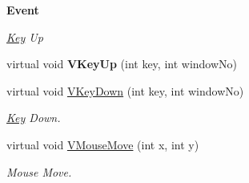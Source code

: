 \begin{Indent}{\bf Event}\par
{\em \label{_amgrpa4ecfc70574394990cf17bd83df499f7}
 \hyperlink{structPlatform_1_1Input_1_1Key}{Key} Up }\begin{DoxyCompactItemize}
\item 
\hypertarget{classPlatform_1_1Input_1_1Input_aaa4710a78618fc48f52d121ae93301fa}{
virtual void {\bfseries VKeyUp} (int key, int windowNo)}
\label{classPlatform_1_1Input_1_1Input_aaa4710a78618fc48f52d121ae93301fa}

\item 
\hypertarget{classPlatform_1_1Input_1_1Input_a37ca3683d6f84d521b4ded7f438ba268}{
virtual void \hyperlink{classPlatform_1_1Input_1_1Input_a37ca3683d6f84d521b4ded7f438ba268}{VKeyDown} (int key, int windowNo)}
\label{classPlatform_1_1Input_1_1Input_a37ca3683d6f84d521b4ded7f438ba268}

\begin{DoxyCompactList}\small\item\em \hyperlink{structPlatform_1_1Input_1_1Key}{Key} Down. \item\end{DoxyCompactList}\item 
\hypertarget{classPlatform_1_1Input_1_1Input_af345cc254cae171098d6b06136dd796c}{
virtual void \hyperlink{classPlatform_1_1Input_1_1Input_af345cc254cae171098d6b06136dd796c}{VMouseMove} (int x, int y)}
\label{classPlatform_1_1Input_1_1Input_af345cc254cae171098d6b06136dd796c}

\begin{DoxyCompactList}\small\item\em Mouse Move. \item\end{DoxyCompactList}\end{DoxyCompactItemize}
\end{Indent}
